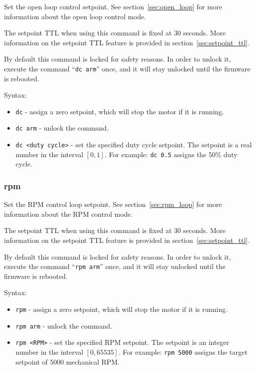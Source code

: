 \documentclass{zubaxdoc}
\begin{document}
	Set the open loop control setpoint.
	See section~\ref{sec:open_loop} for more information about the open loop control mode.
	
	The setpoint TTL when using this command is fixed at 30 seconds.
	More information on the setpoint TTL feature is provided in section~\ref{sec:setpoint_ttl}.
	
	By default this command is locked for safety reasons.
	In order to unlock it, execute the command
	``\verb|dc arm|'' once, and it will stay unlocked until the firmware is rebooted.
	
	Syntax:
	\begin{itemize}
		\item \verb|dc| - assign a zero setpoint, which will stop the motor if it is running.
		\item \verb|dc arm| - unlock the command.
		\item \verb|dc <duty cycle>| - set the specified duty cycle setpoint.
		The setpoint is a real number in the interval $\left[0, 1\right]$.
		For example: \verb|dc 0.5| assigns the 50\% duty cycle.
	\end{itemize}
	
	\subsubsection{rpm}
	
	Set the RPM control loop setpoint.
	See section~\ref{sec:rpm_loop} for more information about the RPM control mode.
	
	The setpoint TTL when using this command is fixed at 30 seconds.
	More information on the setpoint TTL feature is provided in section~\ref{sec:setpoint_ttl}.
	
	By default this command is locked for safety reasons.
	In order to unlock it, execute the command
	``\verb|rpm arm|'' once, and it will stay unlocked until the firmware is rebooted.
	
	Syntax:
	\begin{itemize}
		\item \verb|rpm| - assign a zero setpoint, which will stop the motor if it is running.
		\item \verb|rpm arm| - unlock the command.
		\item \verb|rpm <RPM>| - set the specified RPM setpoint.
		The setpoint is an integer number in the interval $\left[0, 65535\right]$.
		For example: \verb|rpm 5000| assigns the target setpoint of 5000 mechanical RPM.
	\end{itemize}
	
\end{document}
